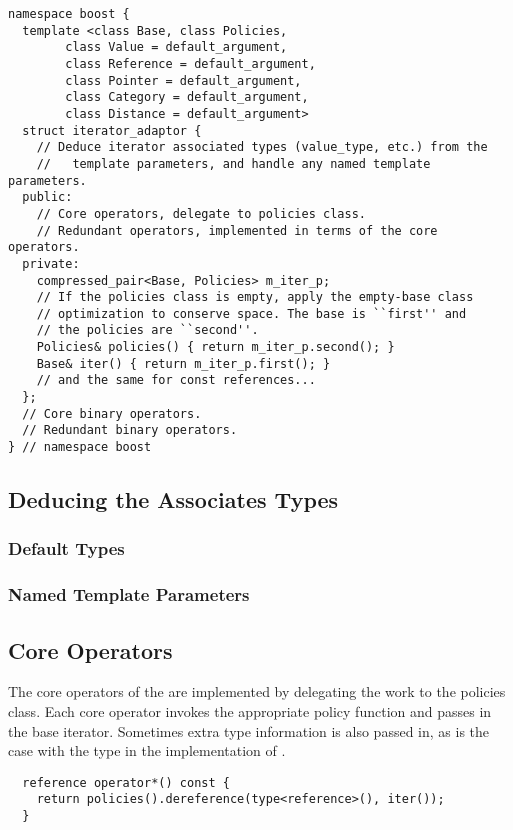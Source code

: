 \documentclass{netobjectdays}
\begin{document}
{\footnotesize
\begin{verbatim}
namespace boost {
  template <class Base, class Policies, 
	    class Value = default_argument,
	    class Reference = default_argument,
	    class Pointer = default_argument,
	    class Category = default_argument,
	    class Distance = default_argument>
  struct iterator_adaptor {
    // Deduce iterator associated types (value_type, etc.) from the
    //   template parameters, and handle any named template parameters.
  public:
    // Core operators, delegate to policies class.
    // Redundant operators, implemented in terms of the core operators.
  private:
    compressed_pair<Base, Policies> m_iter_p;
    // If the policies class is empty, apply the empty-base class
    // optimization to conserve space. The base is ``first'' and
    // the policies are ``second''.
    Policies& policies() { return m_iter_p.second(); }
    Base& iter() { return m_iter_p.first(); }
    // and the same for const references...
  };
  // Core binary operators.
  // Redundant binary operators.
} // namespace boost
\end{verbatim}
}

\subsection{Deducing the Associates Types}

\subsubsection{Default Types}

\subsubsection{Named Template Parameters}


\subsection{Core Operators}

The core operators of the  are implemented by
delegating the work to the policies class. Each core operator invokes
the appropriate policy function and passes in the base
iterator. Sometimes extra type information is also passed in, as is
the case with the  type in the implementation of
.

{\footnotesize
\begin{verbatim}
  reference operator*() const {
    return policies().dereference(type<reference>(), iter());
  }
\end{verbatim}
}
\end{document}
